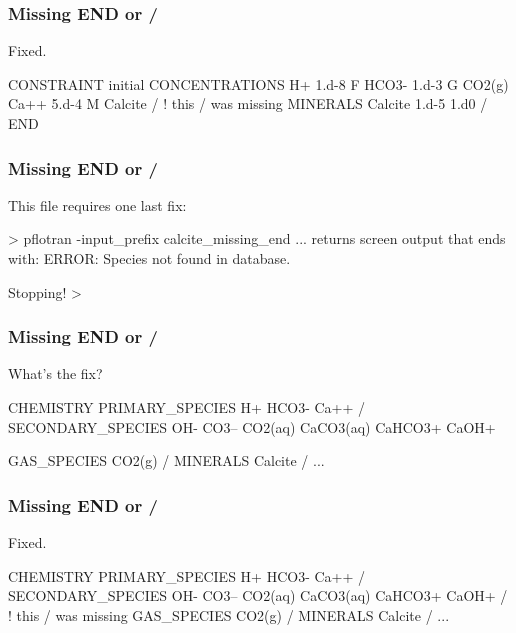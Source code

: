 \documentclass{beamer}
\newcommand\gehcomment[1]{{{\color{orange} #1}}}
\newcommand\redcomment[1]{{{\color{red} #1}}}
\newcommand\bluecomment[1]{{{\color{blue} #1}}}
\newcommand\greencomment[1]{{{\color{green} #1}}}
\newcommand\magentacomment[1]{{{\color{magenta} #1}}}
\begin{document}
\begin{frame}\frametitle{Missing \greencomment{END} or \greencomment{/}}
\redcomment{Fixed.}
\begin{semiverbatim}

CONSTRAINT initial
  CONCENTRATIONS
    H+     1.d-8      F
    HCO3-  1.d-3      G  CO2(g)
    Ca++   5.d-4      M  Calcite
  \magentacomment{/} \bluecomment{! this \greencomment{/} was missing}
  MINERALS
    Calcite 1.d-5 1.d0
  /
END
\end{semiverbatim}

\end{frame}

\begin{frame}\frametitle{Missing \greencomment{END} or \greencomment{/}}
\redcomment{This file requires one last fix:}
\begin{semiverbatim}

> pflotran -input_prefix calcite_missing_end
... \gehcomment{returns screen output that ends with:}
  ERROR: Species not found in database.

  Stopping!
>
\end{semiverbatim}

\end{frame}

\begin{frame}\frametitle{Missing \greencomment{END} or \greencomment{/}}
\redcomment{What's the fix?}
\begin{semiverbatim}
CHEMISTRY
  PRIMARY_SPECIES
    H+
    HCO3-
    Ca++
  /
  SECONDARY_SPECIES
    OH-
    CO3--
    CO2(aq)
    CaCO3(aq)
    CaHCO3+
    CaOH+

  GAS_SPECIES
    CO2(g)
  /
  MINERALS
    Calcite
  /
...
\end{semiverbatim}

\end{frame}

\begin{frame}\frametitle{Missing \greencomment{END} or \greencomment{/}}
\redcomment{Fixed.}
\begin{semiverbatim}
CHEMISTRY
  PRIMARY_SPECIES
    H+
    HCO3-
    Ca++
  /
  SECONDARY_SPECIES
    OH-
    CO3--
    CO2(aq)
    CaCO3(aq)
    CaHCO3+
    CaOH+
  \magentacomment{/} \bluecomment{! this \greencomment{/} was missing}
  GAS_SPECIES
    CO2(g)
  /
  MINERALS
    Calcite
  /
...
\end{semiverbatim}

\end{frame}
\end{document}
